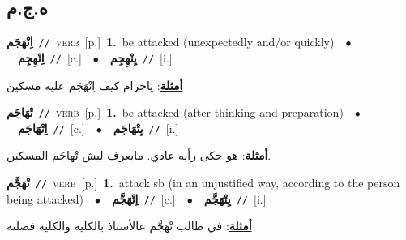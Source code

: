 \documentclass[10pt,a4paper,twoside]{article} %
\begin{document}
\begin{multicols}{2}
\vspace{-3mm}
\subsection*{\color{blue}\foreignlanguage{arabic}{ه.ج.م}\color{blue}{}} 

{\setlength\topsep{0pt}\textbf{\foreignlanguage{arabic}{اِنْهَجَم}}\ {\color{gray}\texttt{//}\color{black}}\ \textsc{verb}\ [p.]\ \textbf{1.}~be attacked (unexpectedly and/or quickly)\ \ $\bullet$\ \ \setlength\topsep{0pt}\textbf{\foreignlanguage{arabic}{اِنْهِجِم}}\ {\color{gray}\texttt{//}\color{black}}\ [c.]\ \ $\bullet$\ \ \setlength\topsep{0pt}\textbf{\foreignlanguage{arabic}{يِنْهِجِم}}\ {\color{gray}\texttt{//}\color{black}}\ [i.]\  \begin{flushright}\color{gray}\foreignlanguage{arabic}{\textbf{\underline{\foreignlanguage{arabic}{أمثلة}}}: ياحرام كيف اِنْهَجَم عليه مسكين}\end{flushright}\color{black}} \vspace{2mm}

{\setlength\topsep{0pt}\textbf{\foreignlanguage{arabic}{تْهَاجَم}}\ {\color{gray}\texttt{//}\color{black}}\ \textsc{verb}\ [p.]\ \textbf{1.}~be attacked (after thinking and preparation)\ \ $\bullet$\ \ \setlength\topsep{0pt}\textbf{\foreignlanguage{arabic}{اِتْهَاجَم}}\ {\color{gray}\texttt{//}\color{black}}\ [c.]\ \ $\bullet$\ \ \setlength\topsep{0pt}\textbf{\foreignlanguage{arabic}{يِتْهَاجَم}}\ {\color{gray}\texttt{//}\color{black}}\ [i.]\  \begin{flushright}\color{gray}\foreignlanguage{arabic}{\textbf{\underline{\foreignlanguage{arabic}{أمثلة}}}: هو حكى رأيه عادي. مابعرف ليش تْهاجَم المسكين.}\end{flushright}\color{black}} \vspace{2mm}

{\setlength\topsep{0pt}\textbf{\foreignlanguage{arabic}{تْهَجَّم}}\ {\color{gray}\texttt{//}\color{black}}\ \textsc{verb}\ [p.]\ \textbf{1.}~attack sb (in an unjustified way, according to the person being attacked)\ \ $\bullet$\ \ \setlength\topsep{0pt}\textbf{\foreignlanguage{arabic}{اِتْهَجَّم}}\ {\color{gray}\texttt{//}\color{black}}\ [c.]\ \ $\bullet$\ \ \setlength\topsep{0pt}\textbf{\foreignlanguage{arabic}{يِتْهَجَّم}}\ {\color{gray}\texttt{//}\color{black}}\ [i.]\  \begin{flushright}\color{gray}\foreignlanguage{arabic}{\textbf{\underline{\foreignlanguage{arabic}{أمثلة}}}: في طالب تْهَجَّم عالأستاذ بالكلية والكلية فصلته}\end{flushright}\color{black}} \vspace{2mm}


\end{multicols}
\end{document}
